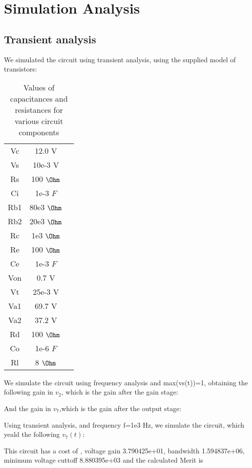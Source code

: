 \section{Simulation Analysis}
\label{sec:simulation}

\subsection{Transient analysis}

We simulated the circuit using transient analysis, using the supplied model of transistors:

\begin{table}[H]
\addtolength{\tabcolsep}{-4pt}
\caption{Values of capacitances and resistances for various circuit components}
\vspace{-3mm}
\begin{tabular}{|c|c|c|}
\hline
Vc & 12.0 V\\
Vs & 10e-3 V\\
Rs & 100 $\Ohm$\\
Ci & 1e-3 $F$\\
Rb1& 80e3 $\Ohm$\\
Rb2&20e3 $\Ohm$\\
Rc & 1e3 $\Ohm$\\
Re &100 $\Ohm$\\
Ce & 1e-3 $F$\\
Von&0.7 V\\
Vt&25e-3 V\\
Va1&69.7 V\\
Va2&37.2 V\\
Rd & 100 $\Ohm$\\
Co & 1e-6 $F$\\
Rl & 8 $\Ohm$\\

\hline
\end{tabular}
\label{tab:Components}
\end{table}

\par

We simulate the circuit using frequency analysis and max(vs(t))=1, obtaining the following gain in $v_2$, which is the gain after the gain stage:


And the gain in $v_7$,which is the gain after the output stage:


\par

Using transient analysis, and frequency f=1e3 Hz, we simulate the circuit, which yeald the following $v_7(t)$:




This circuit has a cost of , voltage gain 3.790425e+01, bandwidth 1.594837e+06, minimum voltage cuttoff 8.880395e+03 and the  calculated Merit is 
